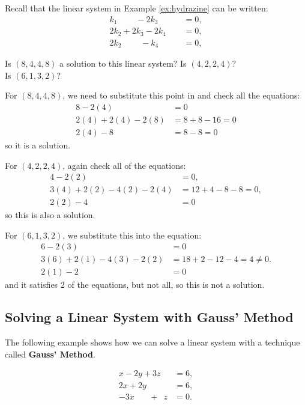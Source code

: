 \begin{example}
Recall that the linear system in Example \ref{ex:hydrazine} can be written:
\begin{align*}
k_1 \phantom{+2k_2}- 2k_3\phantom{+2k_4} & = 0, \\
2k_2 + 2k_3 -2k_4 & = 0, \\
2k_2 \phantom{+2x_3}- k_4 & = 0,
\end{align*}

Is $(8,4,4,8)$ a solution to this linear system?  Is $(4,2,2,4)$? \\  Is $(6,1,3,2)$?

\solution

For $(8,4,4,8)$, we need to substitute this point in and check all the equations:
%
\begin{align*}
8-2(4) & = 0 \\
2(4)+2(4)-2(8) & = 8+8-16 = 0 \\
2(4)-8 & = 8-8 = 0
\end{align*}
so it is a solution.

For $(4,2,2,4)$, again check all of the equations:
%
\begin{align*}
4-2(2) & = 0, \\
3(4)+2(2)-4(2)-2(4) & = 12+4-8-8=0, \\
2(2)-4& = 0
\end{align*}
so this is also a solution.


For $(6,1,3,2)$, we substitute this into the equation:
%
\begin{align*}
6-2(3) & = 0 \\
3(6)+2(1)-4(3)-2(2) & = 18+2-12-4 = 4 \neq 0. \\
2(1) - 2 & = 0
\end{align*}
and it satisfies 2 of the equations, but not all, so this is not a solution.

\end{example}


\subsection{Solving a Linear System with Gauss' Method}

The following example shows how we can solve a linear system with a technique called \textbf{Gauss' Method}.

\begin{align*}
x -2y + 3z  &= 6, \\
2x + 2 y\phantom{+2z} &= 6, \\
-3x \phantom{+2y}+\phantom{3} z  &= 0.
\end{align*}

